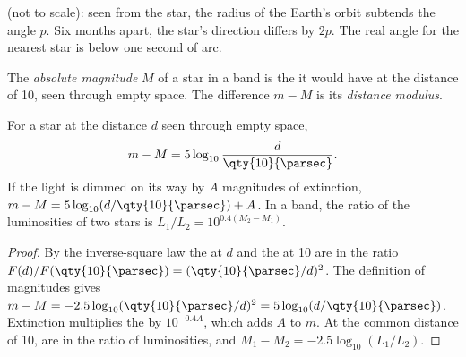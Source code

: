 \begin{omfigure}

{\small {} (not to scale): seen from the star, the radius of
the Earth's orbit subtends the angle $p$. Six months apart, the star's
direction differs by $2p$. The real angle for the nearest star is below one
second of arc.}
\end{omfigure}

\begin{definition}\label{def:b1:observing-the-sky:absolute}
The \emph{absolute magnitude} $M$ of a star in a
band is the  it would have at the distance of
\qty{10}{\parsec}, seen through empty space. The difference $m - M$ is its
\emph{distance modulus}.
\end{definition}

\begin{proposition}\label{prop:b1:observing-the-sky:modulus}
For a star at the distance $d$ seen through empty space,
\[
  m - M = 5\log_{10}\frac{d}{\qty{10}{\parsec}} .
\]
If the light is dimmed on its way by $A$ magnitudes of extinction,
$m - M = 5\log_{10}(d/\qty{10}{\parsec}) + A$. In a band, the ratio of the
luminosities of two stars is $L_1/L_2 = 10^{0.4(M_2 - M_1)}$.
\end{proposition}

\begin{proof}
By the inverse-square law the  at $d$ and the  at \qty{10}{\parsec}
are in the ratio $F(d)/F(\qty{10}{\parsec}) = (\qty{10}{\parsec}/d)^2$. The
definition of magnitudes gives $m - M = -2.5\log_{10}(\qty{10}{\parsec}/d)^2
= 5\log_{10}(d/\qty{10}{\parsec})$. Extinction multiplies the  by
$10^{-0.4A}$, which adds $A$ to $m$. At the common distance of
\qty{10}{\parsec},  are in the ratio of luminosities, and
$M_1 - M_2 = -2.5\log_{10}(L_1/L_2)$.
\end{proof}

